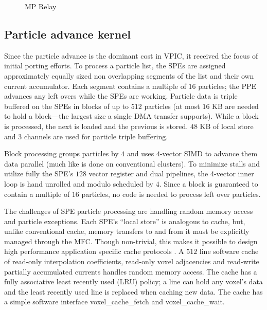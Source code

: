 \documentclass[10pt]{article}
\begin{document}
\begin{figure}
    \begin{center}
    \caption{MP Relay}
    \label{fig:relay}
    \end{center}
\end{figure}

\subsection{Particle advance kernel}

Since the particle advance is the dominant cost in VPIC, it received
the focus of initial porting efforts.  To process a particle list, the
SPEs are assigned approximately equally sized non overlapping segments
of the list and their own current accumulator.  Each segment contains
a multiple of $16$ particles; the PPE advances any left overs while
the SPEs are working.  Particle data is triple buffered on the SPEs in
blocks of up to $512$ particles (at most $16$ KB are needed to hold a
block---the largest size a single DMA transfer supports).  While a
block is processed, the next is loaded and the previous is stored.
$48$ KB of local store and $3$ channels are used for particle triple
buffering.

Block processing groups particles by $4$ and uses $4$-vector SIMD to
advance them data parallel (much like is done on conventional
clusters).  To minimize stalls and utilize fully the SPE's $128$
vector register and dual pipelines, the 4-vector inner loop is hand
unrolled and modulo scheduled by $4$.  Since a block is guaranteed to
contain a multiple of $16$ particles, no code is needed to process
left over particles.

The challenges of SPE particle processing are handling random memory
access and particle exceptions.  Each SPE's ``local store'' is
analogous to cache, but, unlike conventional cache, memory transfers
to and from it must be explicitly managed through the MFC.  Though
non-trivial, this makes it possible to design high performance
application specific cache protocols \cite{Kahle_et_al_2005}.  A $512$
line software cache of read-only interpolation coefficients, read-only
voxel adjacencies and read-write partially accumulated currents
handles random memory access.  The cache has a fully associative least
recently used (LRU) policy; a line can hold any voxel's data and the
least recently used line is replaced when caching new data.  The cache
has a simple software interface voxel\_cache\_fetch and
voxel\_cache\_wait.
\end{document}
